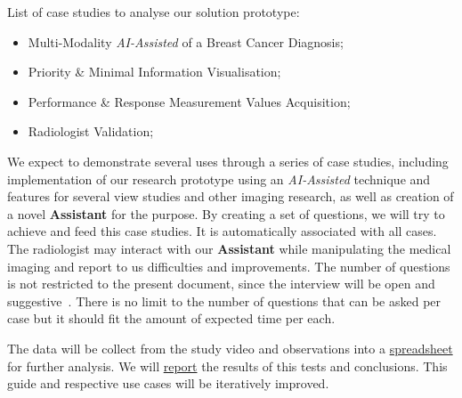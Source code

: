 \hfill

List of case studies to analyse our solution prototype:

\hfill

\begin{itemize}
\item Multi-Modality \textit{AI-Assisted} of a Breast Cancer Diagnosis;
\item Priority \& Minimal Information Visualisation;
\item Performance \& Response Measurement Values Acquisition;
\item Radiologist Validation;
\end{itemize}

\hfill


We expect to demonstrate several uses through a series of case studies, including implementation of our research prototype using an \textit{AI-Assisted} technique and features for several view studies and other imaging research, as well as creation of a novel \textbf{Assistant} for the purpose. By creating a set of questions, we will try to achieve and feed this case studies. It is automatically associated with all cases. The radiologist may interact with our \textbf{Assistant} while manipulating the medical imaging and report to us difficulties and improvements. The number of questions is not restricted to the present document, since the interview will be open and suggestive~\cite{joyce2017healthcare}. There is no limit to the number of questions that can be asked per case but it should fit the amount of expected time per each.

The data will be collect from the study video and observations into a \hyperlink{https://docs.google.com/spreadsheets/d/1CoPLONnINdBWryGs7SBRuPZA-DnQ0t_yzx3u8ym0UoI/edit?usp=sharing}{spreadsheet} for further analysis. We will \hyperlink{https://github.com/mida-project/research-reports}{report} the results of this tests and conclusions. This guide and respective use cases will be iteratively improved.

\clearpage